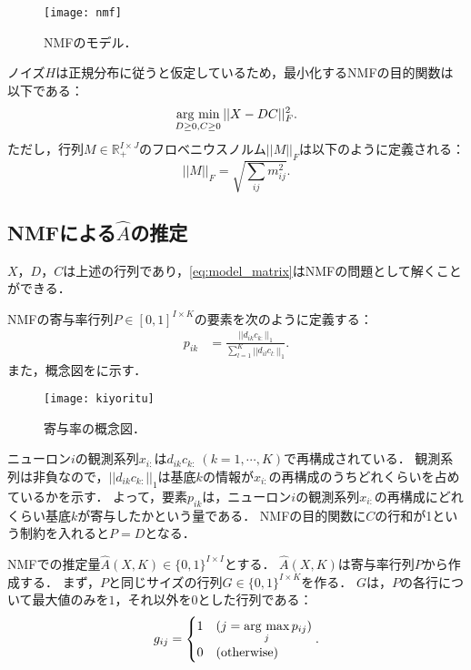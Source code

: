 \begin{figure}[htbp]
	\centering
	\texttt{[image: nmf]}
	\caption{NMFのモデル．}
	\label{fig:nmf}
\end{figure}

ノイズ$H$は正規分布に従うと仮定しているため，最小化するNMFの目的関数は以下である：
\begin{equation}
	\mathop{\textrm{arg~min}}\limits_{D \geq 0, C \geq 0} ||X - DC||_F^2.
	\label{eq:nmf_fro}
\end{equation}
ただし，行列$M \in \mathbb{R}_+^{I \times J}$のフロベニウスノルム$||M||_F$は以下のように定義される：
\begin{equation}
	||M||_F = \sqrt{\sum_{ij} m_{ij}^2}.
\end{equation}

\subsection{NMFによる$\hat{A}$の推定}
$X$，$D$，$C$は上述の行列であり，\eqref{eq:model_matrix}はNMFの問題として解くことができる．

NMFの寄与率行列$P \in [0,1]^{I \times K}$の要素を次のように定義する：
\begin{align}
	p_{ik} &= \frac{||d_{ik} c_{k:}||_1}{\sum_{l=1}^K || d_{il} c_{l:} ||_1}.
\end{align}
また，概念図をに示す．
\begin{figure}[htbp]
	\centering
	\texttt{[image: kiyoritu]}
	\caption{寄与率の概念図．}
	\label{fig:kiyoritu}
\end{figure}
ニューロン$i$の観測系列$x_{i:}$は$d_{ik}c_{k:} \ (k=1,\cdots,K)$で再構成されている．
観測系列は非負なので，$||d_{ik}c_{k:}||_1$は基底$k$の情報が$x_{i:}$の再構成のうちどれくらいを占めているかを示す．
よって，要素$p_{ik}$は，ニューロン$i$の観測系列$x_{i:}$の再構成にどれくらい基底$k$が寄与したかという量である．
NMFの目的関数に$C$の行和が1という制約を入れると$P=D$となる．

NMFでの推定量$\hat{A}(X,K) \in \{0,1\}^{I \times I}$とする．
$\hat{A}(X,K)$は寄与率行列$P$から作成する．
まず，$P$と同じサイズの行列$G \in \{0, 1\}^{I \times K}$を作る．
$G$は，$P$の各行について最大値のみを$1$，それ以外を$0$とした行列である：
\begin{align}
	g_{ij} = \begin{cases}
		1 & (j = \mathop{\textrm{arg~max}}\limits_{j}p_{ij}) \\
		0 & (\text{otherwise})
	\end{cases}.
\end{align}

